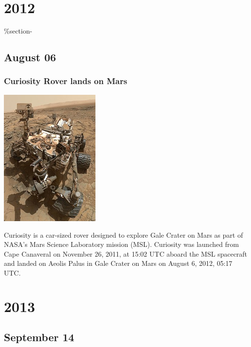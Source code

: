\documentclass[11pt]{report}
\begin{document}
\chapter{2012}
\%section{-}

\section{August 06}
\subsection{Curiosity Rover lands on Mars}
\vspace{2mm}\begin{center}\includegraphics[width=5cm]{./img/curiosityRover.jpg}\end{center}
Curiosity is a car-sized rover designed to explore Gale Crater on Mars as part of NASA's Mars Science Laboratory mission (MSL). Curiosity was launched from Cape Canaveral on November 26, 2011, at 15:02 UTC aboard the MSL spacecraft and landed on Aeolis Palus in Gale Crater on Mars on August 6, 2012, 05:17 UTC.

\chapter{2013}
\section{September 14}
\end{document}
